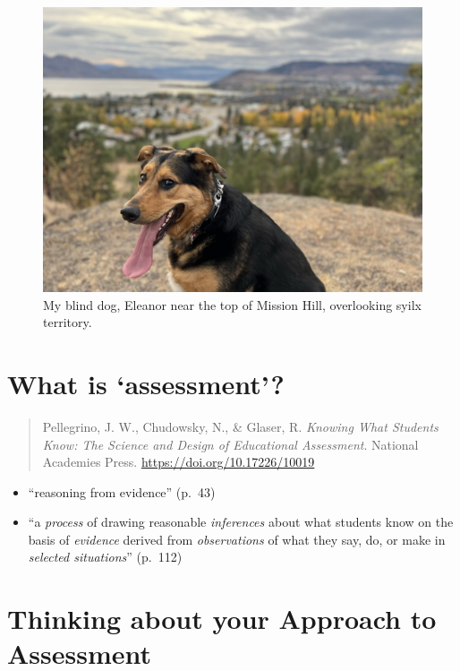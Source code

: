 \documentclass[
]{book}
\providecommand{\tightlist}{%
  \setlength{\itemsep}{0pt}\setlength{\parskip}{0pt}}
\begin{document}
\begin{figure}
\centering
\includegraphics{assets/twu-asmt/ellie.jpeg}
\caption{My blind dog, Eleanor near the top of Mission Hill, overlooking syilx territory.}
\end{figure}

\hypertarget{what-is-assessment}{%
\section{What is `assessment'?}\label{what-is-assessment}}

\begin{quote}
Pellegrino, J. W., Chudowsky, N., \& Glaser, R. \emph{Knowing What Students Know: The Science and Design of Educational Assessment}. National Academies Press. \url{https://doi.org/10.17226/10019}
\end{quote}

\begin{itemize}
\tightlist
\item
  ``reasoning from evidence'' (p.~43)\\
\item
  ``a \emph{process} of drawing reasonable \emph{inferences} about what students know on the basis of \emph{evidence} derived from \emph{observations} of what they say, do, or make in \emph{selected situations}'' (p.~112)
\end{itemize}

\hypertarget{thinking-about-your-approach-to-assessment}{%
\section{Thinking about your Approach to Assessment}\label{thinking-about-your-approach-to-assessment}}
\end{document}
